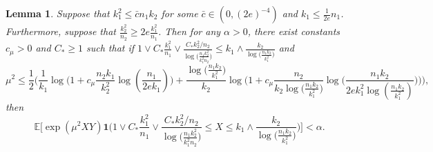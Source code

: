 \documentclass{article}
\newcommand{\EE}{\mathbb{E}}
\newcommand{\one}{\mathbf{1}}
\newcommand{\Ct}{C_{*}}
\newtheorem{lemma}{Lemma}
\begin{document}
\begin{lemma}\label{lem_lb_s2d2big_truncchi2}
    Suppose that $k_1^2 \leq \bar{c}n_1k_2$ for some $\bar{c} \in (0,(2e)^{-4})$ and $k_1 \leq \frac{1}{2e}n_1$. Furthermore, suppose that $\frac{k^2_2}{n_2} \geq 2e\frac{k_1^2}{n_1}$. Then for any $\alpha > 0$, there exist constants $c_\mu > 0$ and $C_* \geq 1$ such that if $1 \vee \Ct \frac{k_1^2}{n_1} \vee  \frac{\Ct k_2^2/n_2}{\log\big(\frac{n_1k_2^2}{k_1^2n_2}\big)} \leq k_1\wedge\frac{k_2}{\log\big(\frac{n_1k_2}{k_1^2}\big)}$ and
    $$\mu^2 \leq \frac12\bigg(\frac{1}{k_1}\log\Big(1 + c_\mu \frac{n_2k_1}{k_2^2}\log(\frac{n_1}{2ek_1})\Big) + \frac{\log\big(\frac{n_1k_2}{k_1^2}\big)}{k_2}\log\Big(1 + c_\mu \frac{n_2}{k_2\log\big(\frac{n_1k_2}{k_1^2}\big)}\log\big(\frac{n_1k_2}{2ek_1^2\log(\frac{n_1k_2}{k_1^2})}\big)\Big)\bigg),$$
    then 
    \[\EE\bigg[\exp(\mu^2XY)\one\bigg( 1 \vee \Ct \frac{k_1^2}{n_1} \vee  \frac{\Ct k_2^2/n_2}{\log\big(\frac{n_1k_2^2}{k_1^2n_2}\big)} \leq X \leq k_1\wedge \frac{k_2}{\log\big(\frac{n_1k_2}{k_1^2}\big)}\bigg)\bigg] < \alpha.\]
\end{lemma}
\end{document}
